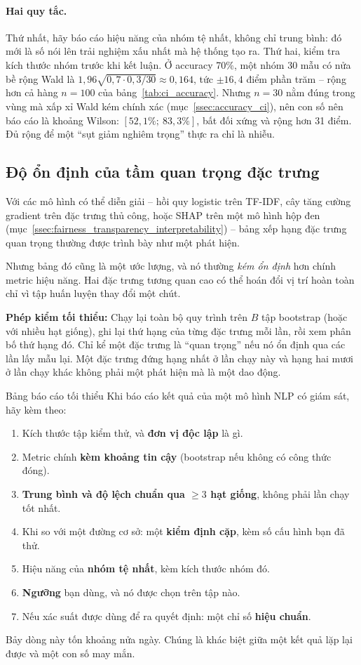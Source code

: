 \paragraph{Hai quy tắc.} Thứ nhất, hãy báo cáo hiệu năng của nhóm tệ nhất, không chỉ trung bình: đó mới là số nói lên trải nghiệm xấu nhất mà hệ thống tạo ra. Thứ hai, kiểm tra kích thước nhóm trước khi kết luận. Ở accuracy 70\%, một nhóm 30 mẫu có nửa bề rộng Wald là $1{,}96\sqrt{0{,}7 \cdot 0{,}3/30} \approx 0{,}164$, tức $\pm 16{,}4$ điểm phần trăm -- rộng hơn cả hàng $n = 100$ của bảng~\ref{tab:ci_accuracy}. Nhưng $n = 30$ nằm đúng trong vùng mà xấp xỉ Wald kém chính xác (mục~\ref{ssec:accuracy_ci}), nên con số nên báo cáo là khoảng Wilson: $[52{,}1\%;\ 83{,}3\%]$, bất đối xứng và rộng hơn 31 điểm. Đủ rộng để một “sụt giảm nghiêm trọng” thực ra chỉ là nhiễu.

\subsection{Độ ổn định của tầm quan trọng đặc trưng}
\label{ssec:feature_stability}

Với các mô hình có thể diễn giải -- hồi quy logistic trên TF-IDF, cây tăng cường gradient trên đặc trưng thủ công, hoặc SHAP trên một mô hình hộp đen (mục~\ref{ssec:fairness_transparency_interpretability}) -- bảng xếp hạng đặc trưng quan trọng thường được trình bày như một phát hiện.

Nhưng bảng đó cũng là một ước lượng, và nó thường \emph{kém ổn định} hơn chính metric hiệu năng. Hai đặc trưng tương quan cao có thể hoán đổi vị trí hoàn toàn chỉ vì tập huấn luyện thay đổi một chút.

\textbf{Phép kiểm tối thiểu:} Chạy lại toàn bộ quy trình trên $B$ tập bootstrap (hoặc với nhiều hạt giống), ghi lại thứ hạng của từng đặc trưng mỗi lần, rồi xem phân bố thứ hạng đó. Chỉ kể một đặc trưng là “quan trọng” nếu nó ổn định qua các lần lấy mẫu lại. Một đặc trưng đứng hạng nhất ở lần chạy này và hạng hai mươi ở lần chạy khác không phải một phát hiện mà là một dao động.

\begin{assess}{Bảng báo cáo tối thiểu}
Khi báo cáo kết quả của một mô hình NLP có giám sát, hãy kèm theo:
\begin{enumerate}
	\item Kích thước tập kiểm thử, và \textbf{đơn vị độc lập} là gì.
	\item Metric chính \textbf{kèm khoảng tin cậy} (bootstrap nếu không có công thức đóng).
	\item \textbf{Trung bình và độ lệch chuẩn qua $\ge 3$ hạt giống}, không phải lần chạy tốt nhất.
	\item Khi so với một đường cơ sở: một \textbf{kiểm định cặp}, kèm số cấu hình bạn đã thử.
	\item Hiệu năng của \textbf{nhóm tệ nhất}, kèm kích thước nhóm đó.
	\item \textbf{Ngưỡng} bạn dùng, và nó được chọn trên tập nào.
	\item Nếu xác suất được dùng để ra quyết định: một chỉ số \textbf{hiệu chuẩn}.
\end{enumerate}
Bảy dòng này tốn khoảng nửa ngày. Chúng là khác biệt giữa một kết quả lặp lại được và một con số may mắn.
\end{assess}
